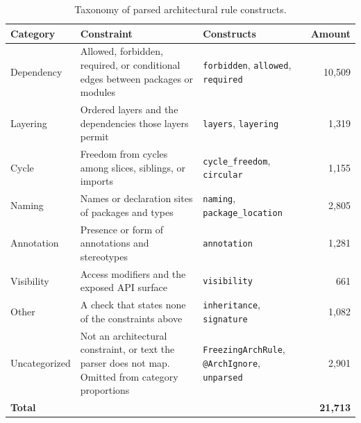 \begin{table}[t]
\centering
\caption{Taxonomy of parsed architectural rule constructs.}
\label{tab:rule_taxonomy}
\small
\setlength{\tabcolsep}{6pt}
\setlength{\aboverulesep}{0pt}
\setlength{\belowrulesep}{0pt}
\renewcommand{\arraystretch}{1.05}
\begin{tabular}{@{}p{2.5cm}p{7.3cm}p{5.5cm}r@{}}
\toprule
\textbf{Category} & \textbf{Constraint} & \textbf{Constructs} & \textbf{Amount} \\
\midrule
\rowcolor{rowband}
Dependency &
Allowed, forbidden, required, or conditional edges between packages or modules &
\texttt{forbidden}, \texttt{allowed}, \texttt{required} &
10{,}509 \\
Layering &
Ordered layers and the dependencies those layers permit &
\texttt{layers}, \texttt{layering} &
1{,}319 \\
\rowcolor{rowband}
Cycle &
Freedom from cycles among slices, siblings, or imports &
\texttt{cycle\_freedom}, \texttt{circular} &
1{,}155 \\
Naming &
Names or declaration sites of packages and types &
\texttt{naming}, \texttt{package\_location} &
2{,}805 \\
\rowcolor{rowband}
Annotation &
Presence or form of annotations and stereotypes &
\texttt{annotation} &
1{,}281 \\
Visibility &
Access modifiers and the exposed API surface &
\texttt{visibility} &
661 \\
\rowcolor{rowband}
Other &
A check that states none of the constraints above &
\texttt{inheritance}, \texttt{signature} &
1{,}082 \\
Uncategorized &
Not an architectural constraint, or text the parser does not map. Omitted from category proportions &
\texttt{FreezingArchRule}, \texttt{@ArchIgnore}, \texttt{unparsed} &
2{,}901 \\
\midrule
\textbf{Total} & & & \textbf{21{,}713} \\
\bottomrule
\end{tabular}
\end{table}
